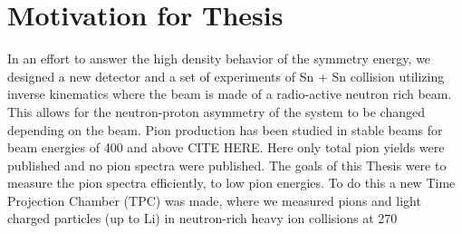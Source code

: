 \section{Motivation for Thesis}
In an effort to answer the high density behavior of the symmetry energy, we designed a new detector and a set of experiments of Sn + Sn collision utilizing inverse kinematics where the beam is made of a radio-active neutron rich beam. This allows for the neutron-proton asymmetry of the system to be changed depending on the beam. Pion production has been studied in stable beams for beam energies of \SI{400}{\MeVA} and above CITE HERE. Here only total pion yields were published and no pion spectra were published. The goals of this Thesis were to measure the pion spectra efficiently, to low pion energies. To do this a new Time Projection Chamber (TPC) was made, where we measured pions and light charged particles (up to Li) in neutron-rich heavy ion collisions at \SI{270}{\MeVA} 






